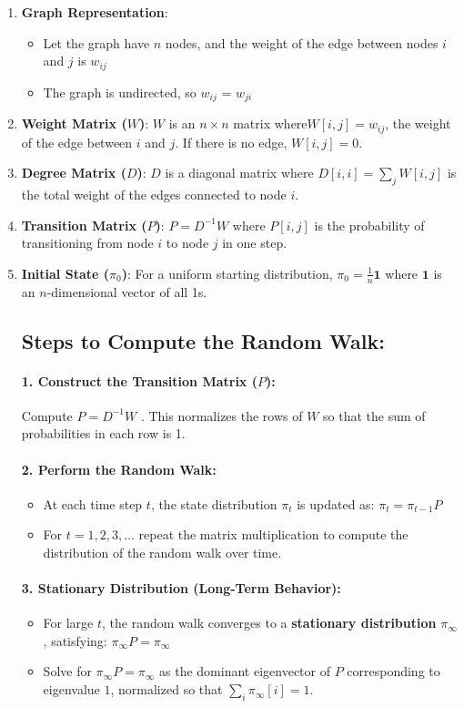 \documentclass{article}
\begin{document}
\begin{enumerate}
    \item \textbf{Graph Representation}:
    \begin{itemize}
        \item Let the graph have $n$ nodes, and the weight of the edge between nodes $i$ and $j$ is $w_{ij}$ 
        \item The graph is undirected, so $w_{ij}$ = $w_{ji}$ 
    \end{itemize}
    \item \textbf{Weight Matrix ($W$)}:
$W$ is an $n\times n$  matrix where$ W[i,j]=w_{ij}$, the weight of the edge between $i$ and $j$. If there is no edge, $W[i,j]=0$.
    \item \textbf{Degree Matrix ($D$)}:
$D$ is a diagonal matrix where $D[i, i]$$ = \sum\limits_{j} W[i, j]$ is the total weight of the edges connected to node $i$.
    \item \textbf{Transition Matrix ($P$)}:   $P=D^{-1}W$ where $P[i,j]$ is the probability of transitioning from node $i$ to node $j$ in one step.
    \item \textbf{Initial State ($\pi_0$)}:
For a uniform starting distribution, $\pi_0=\frac{1}{n}\textbf{1}$ where $\textbf{1}$ is an $n$-dimensional vector of all 1s.
\subsection{Steps to Compute the Random Walk:}
\paragraph{1. \textbf{Construct the Transition Matrix ($P$)}:}
Compute $P=D^{-1}W$ . This normalizes the rows of $W$ so that the sum of probabilities in each row is 1.
\paragraph{2. \textbf{Perform the Random Walk}:}
\begin{itemize}
    \item At each time step $t$, the state distribution $\pi_t$ is updated as: $\pi_t=\pi_{t-1}P$ 
    \item For $t=1,2,3,…$ repeat the matrix multiplication to compute the distribution of the random walk over time.
\end{itemize}
\paragraph{3. \textbf{Stationary Distribution (Long-Term Behavior)}:}
\begin{itemize}
    \item For large $t$, the random walk converges to a \textbf{stationary distribution} $\pi_\infty$, satisfying: $\pi_\infty P=\pi_\infty$
    \item Solve for  $\pi_{\infty}P=\pi_{\infty}$ as the dominant eigenvector of $P$ corresponding to eigenvalue $1$, normalized so that $\sum\limits_i^{}\pi_{\infty}[i] = 1$.
\end{itemize}
 
\end{enumerate}
\end{document}
